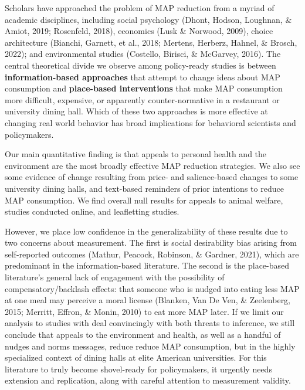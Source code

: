 \documentclass[
  man]{apa6}
\begin{document}
Scholars have approached the problem of MAP reduction from a myriad of academic disciplines, including social psychology (Dhont, Hodson, Loughnan, \& Amiot, 2019; Rosenfeld, 2018), economics (Lusk \& Norwood, 2009), choice architecture (Bianchi, Garnett, et al., 2018; Mertens, Herberz, Hahnel, \& Brosch, 2022); and environmental studies (Costello, Birisci, \& McGarvey, 2016). The central theoretical divide we observe among policy-ready studies is between \textbf{information-based approaches} that attempt to change ideas about MAP consumption and \textbf{place-based interventions} that make MAP consumption more difficult, expensive, or apparently counter-normative in a restaurant or university dining hall. Which of these two approaches is more effective at changing real world behavior has broad implications for behavioral scientists and policymakers.

Our main quantitative finding is that appeals to personal health and the environment are the most broadly effective MAP reduction strategies. We also see some evidence of change resulting from price- and salience-based changes to some university dining halls, and text-based reminders of prior intentions to reduce MAP consumption. We find overall null results for appeals to animal welfare, studies conducted online, and leafletting studies.

However, we place low confidence in the generalizability of these results due to two concerns about measurement. The first is social desirability bias arising from self-reported outcomes (Mathur, Peacock, Robinson, \& Gardner, 2021), which are predominant in the information-based literature. The second is the place-based literature's general lack of engagement with the possibility of compensatory/backlash effects: that someone who is nudged into eating less MAP at one meal may perceive a moral license (Blanken, Van De Ven, \& Zeelenberg, 2015; Merritt, Effron, \& Monin, 2010) to eat more MAP later. If we limit our analysis to studies with deal convincingly with both threats to inference, we still conclude that appeals to the environment and health, as well as a handful of nudges and norms messages, reduce reduce MAP consumption, but in the highly specialized context of dining halls at elite American universities. For this literature to truly become shovel-ready for policymakers, it urgently needs extension and replication, along with careful attention to measurement validity.
\end{document}
